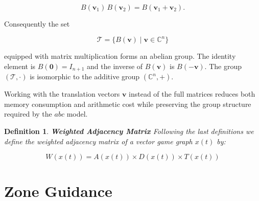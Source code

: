 \documentclass[11pt,a4paper]{article}
\theoremstyle{plain}
\newtheorem{definition}{Definition}[section]
\theoremstyle{definition}
\begin{document}
\vspace{0.5em}

\begin{equation}
B(\mathbf{v}_1)\,B(\mathbf{v}_2)
=
B(\mathbf{v}_1+\mathbf{v}_2).
\end{equation}

\vspace{0.5em}

Consequently the set

\vspace{0.5em}

\[
\mathcal{T}
=
\bigl\{B(\mathbf{v})\;\big|\;\mathbf{v}\in\mathbb{C}^n\bigr\}
\]

\vspace{0.5em}

equipped with matrix multiplication forms an abelian group.  
The identity element is \(B(\mathbf{0})=I_{n+1}\) and the inverse of \(B(\mathbf{v})\) is \(B(-\mathbf{v})\).  
The group \((\mathcal{T},\cdot)\) is isomorphic to the additive group \((\mathbb{C}^n,+)\).

\vspace{0.5em}

Working with the translation vectors \(\mathbf{v}\) instead of the full matrices reduces both memory consumption and arithmetic cost while preserving the group structure required by the \(abc\) model.

\vspace{0.5em}

\begin{definition}\textbf{Weighted Adjacency Matrix}
\label{def:Weighted_Matrix}
Following the last definitions we define the weighted adjacency matrix of a vector game graph
$x(t)$ by:

\vspace{0.5em}

\begin{equation}
W(x(t)) = A(x(t)) \times D(x(t)) \times T(x(t))
\end{equation}

\vspace{0.5em}

\label{def:Weighted-Matrix}
\end{definition}

\vspace{0.5em}


\section{Zone Guidance}
\label{sec:Zone_Guidance}
\end{document}
